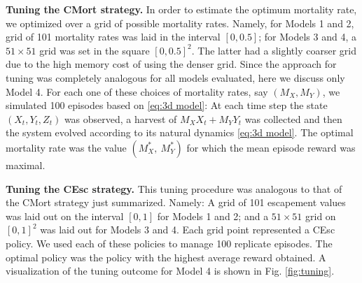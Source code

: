 \documentclass{article}
\begin{document}
\textbf{Tuning the CMort strategy.} In order to estimate the optimum
mortality rate, we optimized over a grid of possible mortality rates.
Namely, for Models 1 and 2, grid of 101 mortality rates was laid in the
interval \([0, 0.5]\); for Models 3 and 4, a \(51\times51\) grid was set
in the square \([0,0.5]^2\). The latter had a slightly coarser grid due
to the high memory cost of using the denser grid. Since the approach for
tuning was completely analogous for all models evaluated, here we
discuss only Model 4. For each one of these choices of mortality rates,
say \((M_X, M_Y)\), we simulated 100 episodes based on
\eqref{eq:3d model}: At each time step the state \((X_t, Y_t, Z_t)\) was
observed, a harvest of \(M_X X_t+M_YY_t\) was collected and then the
system evolved according to its natural dynamics \eqref{eq:3d model}.
The optimal mortality rate was the value \((M_X^*,\ M_Y^*)\) for which
the mean episode reward was maximal.

\textbf{Tuning the CEsc strategy.} This tuning procedure was analogous
to that of the CMort strategy just summarized. Namely: A grid of 101
escapement values was laid out on the interval \([0,1]\) for Models 1
and 2; and a \(51\times 51\) grid on \([0,1]^2\) was laid out for Models
3 and 4. Each grid point represented a CEsc policy. We used each of
these policies to manage 100 replicate episodes. The optimal policy was
the policy with the highest average reward obtained. A visualization of
the tuning outcome for Model 4 is shown in Fig. \ref{fig:tuning}.
\end{document}
